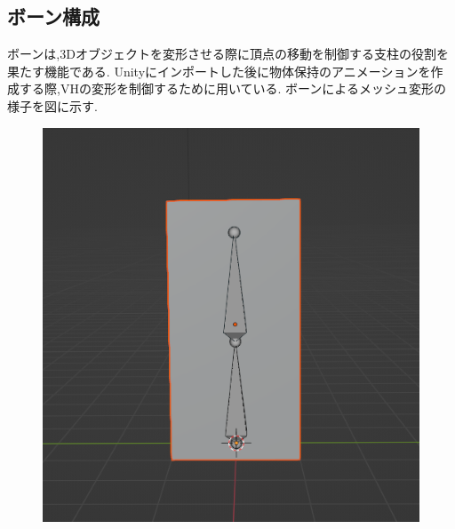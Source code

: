 \documentclass{ltjsreport}
\begin{document}
		\subsection{ボーン構成}
			ボーンは,3Dオブジェクトを変形させる際に頂点の移動を制御する支柱の役割を果たす機能である.
			Unityにインポートした後に物体保持のアニメーションを作成する際,VHの変形を制御するために用いている.
			ボーンによるメッシュ変形の様子を図に示す.
			\begin{figure}[H]
			\centering
			\begin{minipage}{0.3\columnwidth}
			\centering
			\includegraphics[width = \columnwidth]{../figs/bone1.png}
			\end{minipage}
			\hspace{0.04\columnwidth}
			\begin{minipage}{0.3\columnwidth}
			\centering

\end{minipage}
\end{figure}
\end{document}
